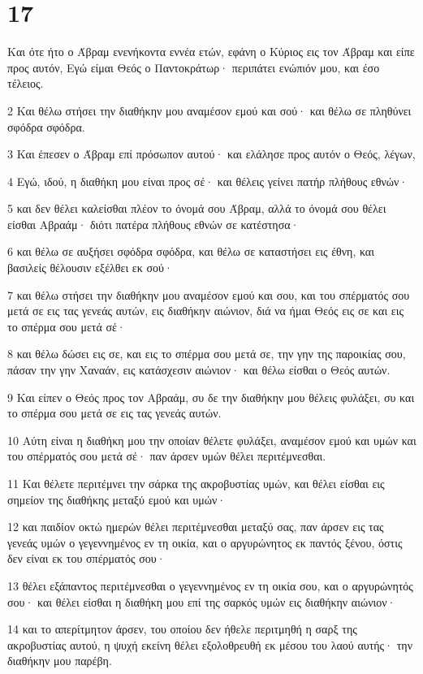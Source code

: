 \chapter{17}

\par Και ότε ήτο ο Άβραμ ενενήκοντα εννέα ετών, εφάνη ο Κύριος εις τον Άβραμ και είπε προς αυτόν, Εγώ είμαι Θεός ο Παντοκράτωρ· περιπάτει ενώπιόν μου, και έσο τέλειος.
\par 2 Και θέλω στήσει την διαθήκην μου αναμέσον εμού και σού· και θέλω σε πληθύνει σφόδρα σφόδρα.
\par 3 Και έπεσεν ο Άβραμ επί πρόσωπον αυτού· και ελάλησε προς αυτόν ο Θεός, λέγων,
\par 4 Εγώ, ιδού, η διαθήκη μου είναι προς σέ· και θέλεις γείνει πατήρ πλήθους εθνών·
\par 5 και δεν θέλει καλείσθαι πλέον το όνομά σου Άβραμ, αλλά το όνομά σου θέλει είσθαι Αβραάμ· διότι πατέρα πλήθους εθνών σε κατέστησα·
\par 6 και θέλω σε αυξήσει σφόδρα σφόδρα, και θέλω σε καταστήσει εις έθνη, και βασιλείς θέλουσιν εξέλθει εκ σού·
\par 7 και θέλω στήσει την διαθήκην μου αναμέσον εμού και σου, και του σπέρματός σου μετά σε εις τας γενεάς αυτών, εις διαθήκην αιώνιον, διά να ήμαι Θεός εις σε και εις το σπέρμα σου μετά σέ·
\par 8 και θέλω δώσει εις σε, και εις το σπέρμα σου μετά σε, την γην της παροικίας σου, πάσαν την γην Χαναάν, εις κατάσχεσιν αιώνιον· και θέλω είσθαι ο Θεός αυτών.
\par 9 Και είπεν ο Θεός προς τον Αβραάμ, συ δε την διαθήκην μου θέλεις φυλάξει, συ και το σπέρμα σου μετά σε εις τας γενεάς αυτών.
\par 10 Αύτη είναι η διαθήκη μου την οποίαν θέλετε φυλάξει, αναμέσον εμού και υμών και του σπέρματός σου μετά σέ· παν άρσεν υμών θέλει περιτέμνεσθαι.
\par 11 Και θέλετε περιτέμνει την σάρκα της ακροβυστίας υμών, και θέλει είσθαι εις σημείον της διαθήκης μεταξύ εμού και υμών·
\par 12 και παιδίον οκτώ ημερών θέλει περιτέμνεσθαι μεταξύ σας, παν άρσεν εις τας γενεάς υμών ο γεγεννημένος εν τη οικία, και ο αργυρώνητος εκ παντός ξένου, όστις δεν είναι εκ του σπέρματός σου·
\par 13 θέλει εξάπαντος περιτέμνεσθαι ο γεγεννημένος εν τη οικία σου, και ο αργυρώνητός σου· και θέλει είσθαι η διαθήκη μου επί της σαρκός υμών εις διαθήκην αιώνιον·
\par 14 και το απερίτμητον άρσεν, του οποίου δεν ήθελε περιτμηθή η σαρξ της ακροβυστίας αυτού, η ψυχή εκείνη θέλει εξολοθρευθή εκ μέσου του λαού αυτής· την διαθήκην μου παρέβη.
